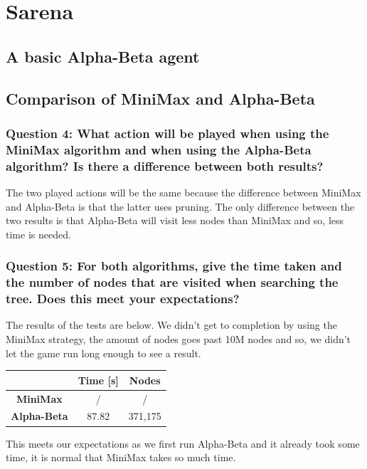 \documentclass[a4paper,10pt]{article}
\begin{document}
	\section{Sarena}
		\subsection{A basic Alpha-Beta agent}
		
		\subsection{Comparison of MiniMax and Alpha-Beta}
			\subsubsection{Question 4: What action will be played when using the MiniMax algorithm and when using the Alpha-Beta algorithm? Is there a difference between both results?}
			The two played actions will be the same because the difference between MiniMax and Alpha-Beta is that the latter uses pruning. The only difference between the two results is that Alpha-Beta will visit less nodes than MiniMax and so, less time is needed.
			\subsubsection{Question 5: For both algorithms, give the time taken and the number of nodes that are visited when searching the tree. Does this meet your expectations?}
				The results of the tests are below. We didn't get to completion by using the MiniMax strategy, the amount of nodes goes past 10M nodes and so, we didn't let the game run long enough to see a result.
				\begin{center}
					\begin{tabular}{|c||c|c|}
						\hline 
						 & \textbf{Time [s]} & \textbf{Nodes} \\ 
						\hline 
						\textbf{MiniMax} & / & / \\ 
						\hline 
						\textbf{Alpha-Beta} & 87.82 & 371,175 \\
						\hline 
					\end{tabular}
				\end{center} 
				This meets our expectations as we first run Alpha-Beta and it already took some time, it is normal that MiniMax takes so much time.
\end{document}
